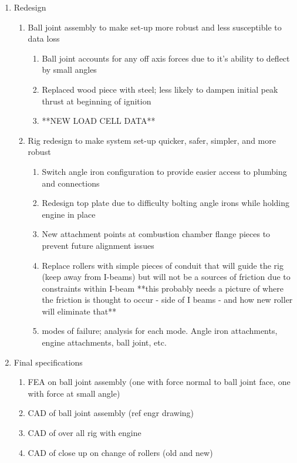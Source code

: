 \documentclass[10pt,a4paper]{article}
\begin{document}
\begin{enumerate}
 	\item Redesign
 	\begin{enumerate}
 		\item Ball joint assembly to make set-up more robust and less susceptible to data loss
 		\begin{enumerate}
 			\item Ball joint accounts for any off axis forces due to it's ability to deflect by small angles
 			\item Replaced wood piece with steel; less likely to dampen initial peak thrust at beginning of ignition
 			\item **NEW LOAD CELL DATA**
 		\end{enumerate}
 		\item Rig redesign to make system set-up quicker, safer, simpler, and more robust
 		\begin{enumerate}
 			\item Switch angle iron configuration to provide easier access to plumbing and connections
 			\item Redesign top plate due to difficulty bolting angle irons while holding engine in place
 			\item New attachment points at combustion chamber flange pieces to prevent future alignment issues 
 			\item Replace rollers with simple pieces of conduit that will guide the rig (keep away from I-beams) but will not be a sources of friction due to constraints within I-beam **this probably needs a picture of where the friction is thought to occur - side of I beams - and how new roller will eliminate that**
 			\item modes of failure; analysis for each mode. Angle iron attachments, engine attachments, ball joint, etc.
 		\end{enumerate}
 	\end{enumerate}
 	\item Final specifications
 	\begin{enumerate}
 		\item FEA on ball joint assembly (one with force normal to ball joint face, one with force at small angle)
 		\item CAD of ball joint assembly (ref engr drawing)
 		\item CAD of over all rig with engine
 		\item CAD of close up on change of rollers (old and new)
 	\end{enumerate}
 \end{enumerate}
\end{document}
